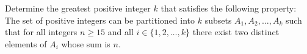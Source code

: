 Determine the greatest positive integer 
$k$
 that satisfies the following property: The set of positive integers can be partitioned into 
$k$
 subsets 
$A_1, A_2, \ldots, A_k$
 such that for all integers 
$n \geq 15$
 and all 
$i \in \{1, 2, \ldots, k\}$
 there exist two distinct elements of 
$A_i$
 whose sum is 
$n.$
